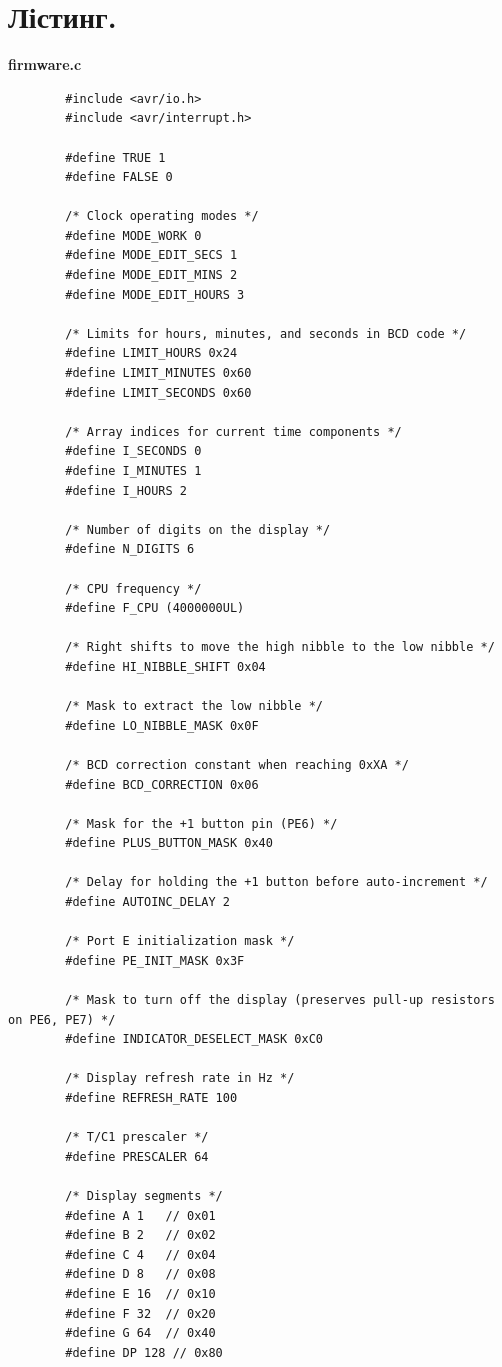 \documentclass[14pt, a4paper]{extreport}
\begin{document}
	\pagebreak
	
	\section*{Лістинг.}
	
	\textbf{firmware.c}
	
	\begin{verbatim} 
		#include <avr/io.h>
		#include <avr/interrupt.h>
		
		#define TRUE 1
		#define FALSE 0
		
		/* Clock operating modes */
		#define MODE_WORK 0
		#define MODE_EDIT_SECS 1
		#define MODE_EDIT_MINS 2
		#define MODE_EDIT_HOURS 3
		
		/* Limits for hours, minutes, and seconds in BCD code */
		#define LIMIT_HOURS 0x24
		#define LIMIT_MINUTES 0x60
		#define LIMIT_SECONDS 0x60
		
		/* Array indices for current time components */
		#define I_SECONDS 0
		#define I_MINUTES 1
		#define I_HOURS 2
		
		/* Number of digits on the display */
		#define N_DIGITS 6
		
		/* CPU frequency */
		#define F_CPU (4000000UL)
		
		/* Right shifts to move the high nibble to the low nibble */
		#define HI_NIBBLE_SHIFT 0x04
		
		/* Mask to extract the low nibble */
		#define LO_NIBBLE_MASK 0x0F
		
		/* BCD correction constant when reaching 0xXA */
		#define BCD_CORRECTION 0x06
		
		/* Mask for the +1 button pin (PE6) */
		#define PLUS_BUTTON_MASK 0x40
		
		/* Delay for holding the +1 button before auto-increment */
		#define AUTOINC_DELAY 2
		
		/* Port E initialization mask */
		#define PE_INIT_MASK 0x3F
		
		/* Mask to turn off the display (preserves pull-up resistors on PE6, PE7) */
		#define INDICATOR_DESELECT_MASK 0xC0
		
		/* Display refresh rate in Hz */
		#define REFRESH_RATE 100
		
		/* T/C1 prescaler */
		#define PRESCALER 64
		
		/* Display segments */
		#define A 1   // 0x01
		#define B 2   // 0x02
		#define C 4   // 0x04
		#define D 8   // 0x08
		#define E 16  // 0x10
		#define F 32  // 0x20
		#define G 64  // 0x40
		#define DP 128 // 0x80
		

\end{verbatim}
\end{document}
